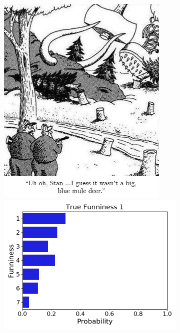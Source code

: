 \documentclass[draft,final,oneside]{vutinfth} %
\begin{document}
\begin{figure}
\centering

\begin{subfigure}[b]{0.45\textwidth}
\centering
\includegraphics[width=0.9\textwidth,height=0.3\textheight,keepaspectratio]{graphics/detail/Test_for_Image_1_cartoon} \\
\includegraphics[width=1.0\textwidth]{graphics/detail/Test_for_Image_1}

\end{subfigure}
\end{figure}
\end{document}
